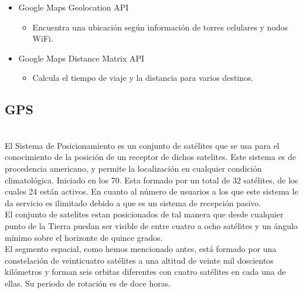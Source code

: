 \documentclass[a4paper, 11pt]{article}
\begin{document}
\begin{itemize}
\begin{itemize}
\begin{itemize}
\begin{itemize}
{                                cualquier lugar del mundo.}
                      \end{itemize}
                    \item{Google Maps Geolocation API}
                        \begin{itemize}
                            \item{Encuentra una ubicación según información de
                                  torres celulares y nodos WiFi.}
                        \end{itemize}
                      \item{Google Maps Distance Matrix API}
                        \begin{itemize}
                            \item{Calcula el tiempo de viaje y la distancia para
                                  varios destinos.}
                        \end{itemize}
                \end{itemize}
          \end{itemize}

        \subsection{GPS}\\
        
          El Sistema de Posicionamiento es un conjunto de satélites que se usa
          para el conocimiento de la posición de un receptor de dichos satelites.
          Este sistema es de procedencia americano, y permite la localización en
          cualquier condición climatológica. Iniciado en los 70. Esta formado
          por un total de 32 satélites, de los cuales 24 están activos. En
          cuanto al número de usuarios a los que este sistema le da servicio es
          ilimitado debido a que es un sistema de recepción pasivo.\\

          El conjunto de satelites estan posicionados de tal manera que desde
          cualquier punto de la Tierra puedan ser visible de entre cuatro a
          ocho satélites y un ángulo mínimo sobre el horizonte de quince grados.\\

          El segmento espacial, como hemos mencionado antes, está formado por
          una constelación de veinticuatro satélites a una altitud de veinte mil
          doscientos kilómetros y forman seis orbitas diferentes con cuatro
          satélites en cada una de ellas. Su periodo de rotación es de doce
          horas.\\


\end{itemize}
\end{document}
